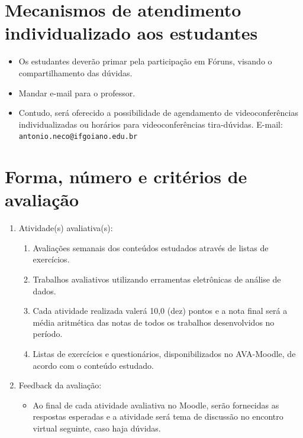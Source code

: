 \documentclass[
]{book}
\providecommand{\tightlist}{%
  \setlength{\itemsep}{0pt}\setlength{\parskip}{0pt}}
\begin{document}
\hypertarget{mecanismos-de-atendimento-individualizado-aos-estudantes}{%
\section{Mecanismos de atendimento individualizado aos estudantes}\label{mecanismos-de-atendimento-individualizado-aos-estudantes}}

\begin{itemize}
\tightlist
\item
  Os estudantes deverão primar pela participação em Fóruns, visando o compartilhamento das dúvidas.
\item
  Mandar e-mail para o professor.
\item
  Contudo, será oferecido a possibilidade de agendamento de videoconferências individualizadas ou horários para videoconferências tira-dúvidas.
  E-mail: \texttt{antonio.neco@ifgoiano.edu.br}
\end{itemize}

\hypertarget{forma-nuxfamero-e-crituxe9rios-de-avaliauxe7uxe3o}{%
\section{Forma, número e critérios de avaliação}\label{forma-nuxfamero-e-crituxe9rios-de-avaliauxe7uxe3o}}

\begin{enumerate}
\def\labelenumi{\arabic{enumi})}
\item
  Atividade(s) avaliativa(s):

  \begin{enumerate}
  \def\labelenumii{\arabic{enumii}.}
  \tightlist
  \item
    Avaliações semanais dos conteúdos estudados através de listas de exercícios.
  \item
    Trabalhos avaliativos utilizando erramentas eletrônicas de análise de dados.
  \item
    Cada atividade realizada valerá 10,0 (dez) pontos e a nota final será a média aritmética das notas de todos os trabalhos desenvolvidos no período.
  \item
    Listas de exercícios e questionários, disponibilizados no AVA-Moodle, de acordo com o conteúdo estudado.
  \end{enumerate}
\item
  Feedback da avaliação:

  \begin{itemize}
  \tightlist
  \item
    Ao final de cada atividade avaliativa no Moodle, serão fornecidas as respostas esperadas e a atividade será tema de discussão no encontro virtual seguinte, caso haja dúvidas.
  \end{itemize}
\end{enumerate}
\end{document}
